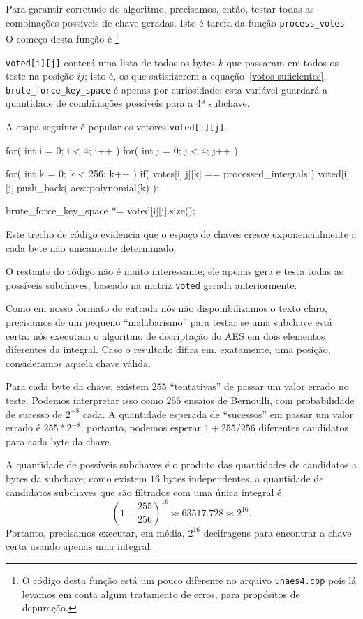 \documentclass{article}
\begin{document}
Para garantir corretude do algoritmo,
precisamos, então, testar todas as combinações possíveis de chave geradas.
Isto é tarefa da função \verb"process_votes".
O começo desta função é%
\footnote{
    O código desta função está um pouco diferente no arquivo \texttt{unaes4.cpp}
    pois lá levamos em conta algum tratamento de erros,
    para propósitos de depuração.
}
\begin{cppcode}
    void process_votes() {
        std::vector<aes::polynomial> voted[4][4];
        int brute_force_key_space = 1;
\end{cppcode}
\verb"voted[i][j]" conterá uma lista de todos os bytes $k$
que passaram em todos os teste na posição $ij$;
isto é, os que satisfizerem a equação~\ref{votos-suficientes}.
\verb"brute_force_key_space" é apenas por curiosidade:
esta variável guardará a quantidade de combinações possíveis para a 4ª subchave.

A etapa seguinte é popular os vetores \verb"voted[i][j]".
\begin{cppcode}
        for( int i = 0; i < 4; i++ )
        for( int j = 0; j < 4; j++ ) {
            for( int k = 0; k < 256; k++ )
                if( votes[i][j][k] == processed_integrals )
                    voted[i][j].push_back( aes::polynomial(k) );

            brute_force_key_space *= voted[i][j].size();
        }
\end{cppcode}
Este trecho de código evidencia que o espaço de chaves
cresce exponencialmente a cada byte não unicamente determinado.

O restante do código não é muito interessante;
ele apenas gera e testa todas as possíveis subchaves,
baseado na matriz \verb"voted" gerada anteriormente.

Como em nosso formato de entrada nós não disponibilizamos o texto claro,
precisamos de um pequeno ``malabarismo'' para testar se uma subchave está certa:
nós executam o algoritmo de decriptação do AES
em dois elementos diferentes da integral.
Caso o resultado difira em, exatamente, uma posição,
consideramos aquela chave válida.

Para cada byte da chave,
existem $255$ ``tentativas'' de passar um valor errado no teste.
Podemos interpretar isso como $255$ ensaios de Bernoulli,
com probabilidade de sucesso de $2^{-8}$ cada.
A quantidade esperada de ``sucessos'' em passar um valor errado
é $255*2^{-8}$;
portanto, podemos esperar $1 + 255/256$
diferentes candidatos para cada byte da chave.

A quantidade de possíveis subchaves
é o produto das quantidades de candidatos a bytes da subchave;
como existem $16$ bytes independentes,
a quantidade de candidatos subchaves que são filtrados com uma única integral é
\begin{equation*}
    \left(1 + \frac{255}{256}\right) ^{16} \approx 63517.728 \approx 2^{16}.
\end{equation*}
Portanto, precisamos executar,
em média, $2^{16}$ decifragens para encontrar a chave certa
usando apenas uma integral.
\end{document}

